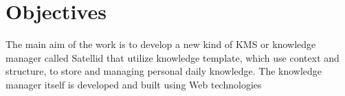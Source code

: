\section{Objectives}
\label{sec:objectives}

The main aim of the work is to develop a new kind of \ac{KMS} or knowledge manager called Satellid that utilize knowledge template, which use context and structure, to store and managing personal daily knowledge.
The knowledge manager itself is developed and built using Web technologies

